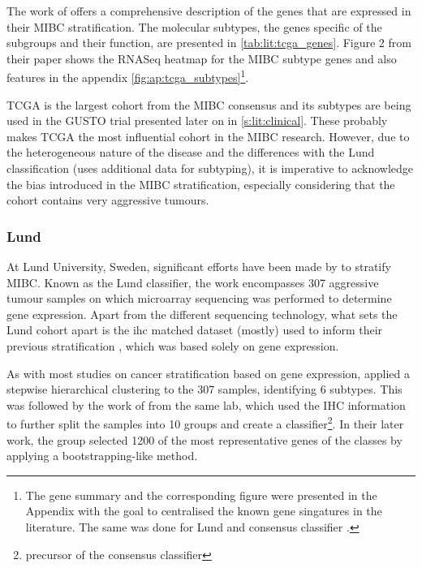 The work of \citet{Robertson2017-mg} offers a comprehensive description of the genes that are expressed in their MIBC stratification. The molecular subtypes, the genes specific of the subgroups and their function, are presented in \cref{tab:lit:tcga_genes}. Figure 2 from their paper shows the RNASeq heatmap for the MIBC subtype genes and also features in the appendix \cref{fig:ap:tcga_subtypes}\footnote{The gene summary and the corresponding figure were presented in the Appendix with the goal to centralised the known gene singatures in the literature. The same was done for Lund and consensus classifier \citep{Marzouka2018-ge,Kamoun2020-tj}.}.


TCGA is the largest cohort from the MIBC consensus and its subtypes are being used in the GUSTO trial presented later on in \cref{s:lit:clinical}. These probably makes TCGA the most influential cohort in the MIBC research. However, due to the heterogeneous nature of the disease and the differences with the Lund classification (uses additional data for subtyping), it is imperative to acknowledge the bias introduced in the MIBC stratification, especially considering that the cohort contains very aggressive tumours.

\subsubsection*{Lund} \label{s:lit:lund_mibc}

At Lund University, Sweden, significant efforts have been made by \citep{Sjodahl2017-xr, Marzouka2018-ge} to stratify MIBC. Known as the Lund classifier, the work encompasses 307 aggressive tumour samples on which microarray sequencing was performed to determine gene expression. Apart from the different sequencing technology, what sets the Lund cohort apart is the \acrfull{ihc} matched dataset (mostly) used to inform their previous stratification \citet{Sjodahl2017-xr}, which was based solely on gene expression.

As with most studies on cancer stratification based on gene expression, \citet{Sjodahl2017-xr} applied a stepwise hierarchical clustering to the 307 samples, identifying 6 subtypes. This was followed by the work of \citet{Marzouka2018-ge} from the same lab, which used the IHC information to further split the samples into 10 groups and create a classifier\footnote{precursor of the consensus classifier}. In their later work, the group selected 1200 of the most representative genes of the classes by applying a bootstrapping-like method.

